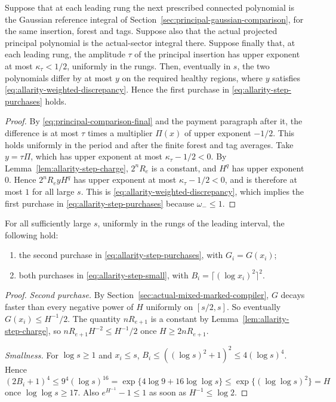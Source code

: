 \begin{lemma}
\label{lem:allarity-step-discrepancy}
Suppose that at each leading rung the next prescribed connected
polynomial is the Gaussian reference integral of
Section~\ref{sec:principal-gaussian-comparison}, for the same insertion,
forest and tags. Suppose also that the actual projected principal
polynomial is the actual-sector integral there. Suppose finally that,
at each leading rung, the amplitude $\tau$ of the principal insertion has
upper exponent at most $\kappa_\tau<1/2$, uniformly in the rungs. Then,
eventually in $s$, the two polynomials differ by at most $y$ on the
required healthy regions, where $y$ satisfies
\eqref{eq:allarity-weighted-discrepancy}. Hence the first purchase in
\eqref{eq:allarity-step-purchases} holds.
\end{lemma}
\begin{proof}
By \eqref{eq:principal-comparison-final} and the payment paragraph after
it, the difference is at most $\tau$ times a multiplier $\Pi(x)$ of upper
exponent $-1/2$. This holds uniformly in the period and after the finite
forest and tag averages. Take $y=\tau\Pi$, which has upper exponent at
most $\kappa_\tau-1/2<0$. By Lemma~\ref{lem:allarity-step-charge},
$2^nR_e$ is a constant, and $H^{q}$ has upper exponent $0$. Hence
$2^nR_eyH^{q}$ has upper exponent at most $\kappa_\tau-1/2<0$, and is
therefore at most $1$ for all large $s$. This is
\eqref{eq:allarity-weighted-discrepancy}, which implies the first
purchase in \eqref{eq:allarity-step-purchases} because
$\omega_-\le1$.
\end{proof}

\begin{lemma}
\label{lem:allarity-step-purchases}
For all sufficiently large $s$, uniformly in the rungs of the leading
interval, the following hold:
\begin{enumerate}
\item the second purchase in \eqref{eq:allarity-step-purchases}, with
 $G_i=G(x_i)$;
\item both purchases in \eqref{eq:allarity-step-small}, with
 $B_i=\lceil(\log x_i)^2\rceil^2$.
\end{enumerate}
\end{lemma}
\begin{proof}
\emph{Second purchase.} By Section~\ref{sec:actual-mixed-marked-compiler},
$G$ decays faster than every negative power of $H$ uniformly on
$[s/2,s]$. So eventually $G(x_i)\le H^{-1}/2$. The quantity
$nR_{e+1}$ is a constant by Lemma~\ref{lem:allarity-step-charge}, so
$nR_{e+1}H^{-2}\le H^{-1}/2$ once $H\ge2nR_{e+1}$.

\emph{Smallness.} For $\log s\ge1$ and $x_i\le s$,
$B_i\le((\log s)^2+1)^2\le4(\log s)^4$. Hence
\[
 (2B_i+1)^4\le9^4(\log s)^{16}
 =\exp\{4\log9+16\log\log s\}\le\exp\{(\log\log s)^2\}=H
\]
once $\log\log s\ge17$. Also $e^{H^{-1}}-1\le1$ as soon as
$H^{-1}\le\log2$.
\end{proof}

